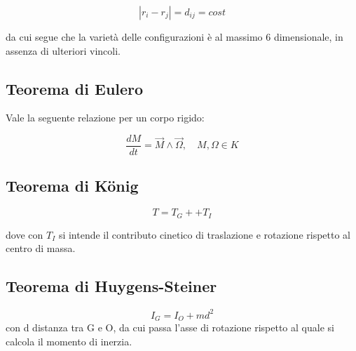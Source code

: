 \documentclass{article}
\begin{document}
        \begin{equation}
            |r_i-r_j|=d_{ij}=cost
        \end{equation}

        da cui segue che la varietà delle configurazioni è al massimo 6 dimensionale, in assenza di ulteriori vincoli.

        \subsection{Teorema di Eulero}
        Vale la seguente relazione per un corpo rigido:

        \begin{equation}
            \frac{d M}{dt}= \vec{M}\wedge \vec{\Omega}, \quad M, \Omega \in K
        \end{equation}

        \subsection{Teorema di König}

        \begin{equation}
            T= T_{G}++ T_{I}
        \end{equation}

        dove con $T_I$ si intende il contributo cinetico di traslazione e rotazione rispetto al centro di massa.
\subsection{Teorema di Huygens-Steiner}

\begin{equation}
    I_G= I_O+ md^2
\end{equation}
con d distanza tra G e O, da cui passa l'asse di rotazione rispetto al quale si calcola il momento di inerzia.
\end{document}
